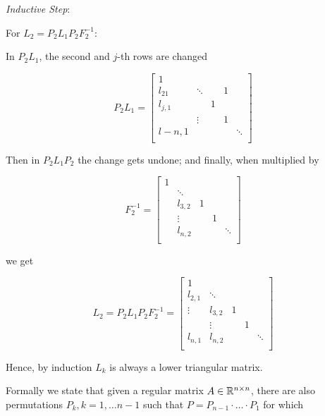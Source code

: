 \emph{Inductive Step}:

For \(L_2 = P_2 L_1 P_2 F_{2}^{-1}\): 

In \(P_2 L_1\), the second and \(j\)-th rows are changed

\[
    P_2 L_1= 
        \begin{bmatrix}
            1 &        &         &   &        \\
             l_{2 1}& \ddots &         &  1 &        \\
             l_{j,1} &        & 1       &   &        \\
            & \vdots       &  & 1 &        \\
            l-{n,1} &        &        &   & \ddots \\
        \end{bmatrix}
\]

Then in \(P_2 L_1 P_2\) the change gets undone; and finally, when multiplied by 

\[
    F_{2}^{-1} =     
        \begin{bmatrix}
            1 &        &         &   &        \\
              & \ddots &         &   &        \\
              &  l_{3,2}     & 1       &   &        \\
              &   \vdots    &  & 1 &        \\
              &  l_{n,2}      &        &   & \ddots \\
        \end{bmatrix}
\]

we get 

\[
    L_2 = P_2 L_1 P_2 F_{2}^{-1} =     
        \begin{bmatrix}
            1 &        &         &   &        \\
            l_{2,1}  & \ddots &         &   &        \\
            \vdots  &  l_{3,2}     & 1       &   &        \\
              &   \vdots    &  & 1 &        \\
            l_{n, 1}  &  l_{n,2}      &        &   & \ddots \\
        \end{bmatrix}
\]

Hence, by induction \(L_k\) is always a lower triangular matrix.

\QED

Formally we state that given a regular matrix \(A \in \mathbb{R}^{n \times n}\), there are also permutations \(P_k, k = 1, \dots n - 1\) such that 
\(P = P_{n-1} \cdot \dots \cdot P_1\) for which 

